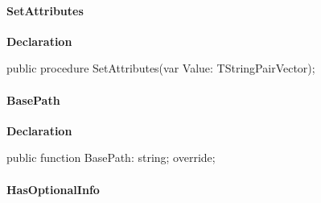 \documentclass{report}
\newif\ifpdf
\begin{document}
\paragraph*{SetAttributes}\hspace*{\fill}

\label{PasDoc_Items.TPasItem-SetAttributes}
\begin{list}{}{
\setlength{\itemindent}{0cm}
\setlength{\listparindent}{0cm}
\setlength{\leftmargin}{\evensidemargin}
\addtolength{\leftmargin}{\tmplength}
\settowidth{\labelsep}{X}
\addtolength{\leftmargin}{\labelsep}
\setlength{\labelwidth}{\tmplength}
}
\item[\textbf{Declaration}\hfill]
\ifpdf
\begin{flushleft}
\fi
\begin{ttfamily}
public procedure SetAttributes(var Value: TStringPairVector);\end{ttfamily}

\ifpdf
\end{flushleft}
\fi

\end{list}
\paragraph*{BasePath}\hspace*{\fill}

\label{PasDoc_Items.TPasItem-BasePath}
\begin{list}{}{
\setlength{\itemindent}{0cm}
\setlength{\listparindent}{0cm}
\setlength{\leftmargin}{\evensidemargin}
\addtolength{\leftmargin}{\tmplength}
\settowidth{\labelsep}{X}
\addtolength{\leftmargin}{\labelsep}
\setlength{\labelwidth}{\tmplength}
}
\item[\textbf{Declaration}\hfill]
\ifpdf
\begin{flushleft}
\fi
\begin{ttfamily}
public function BasePath: string; override;\end{ttfamily}

\ifpdf
\end{flushleft}
\fi

\end{list}
\paragraph*{HasOptionalInfo}\hspace*{\fill}
\end{document}
